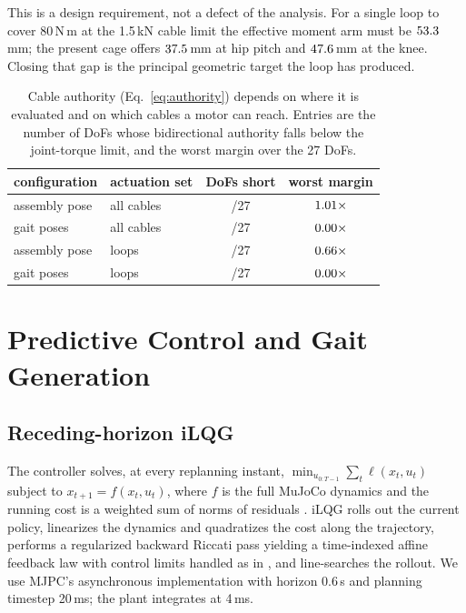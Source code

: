 \documentclass[conference]{IEEEtran}
\begin{document}
This is a design requirement, not a defect of the analysis. For a single loop
to cover 80\,N\,m at the 1.5\,kN cable limit the effective moment arm must be
$53.3$\,mm; the present cage offers $37.5$\,mm at hip pitch and
$47.6$\,mm at the knee. Closing that gap is the principal geometric
target the loop has produced.

\begin{table}[tb]
\centering
\caption{Cable authority (Eq.~\ref{eq:authority}) depends on where it is
evaluated and on which cables a motor can reach. Entries are the number of
DoFs whose bidirectional authority falls below the joint-torque limit, and the
worst margin over the 27 DoFs.}
\label{tab:authority}
\begin{tabular}{llcc}
\toprule
configuration & actuation set & DoFs short & worst margin\\
\midrule
assembly pose & all cables & \authShortHomeAll{}/27 & $1.01\times$\\
gait poses    & all cables & \authShortGaitAll{}/27 & $0.00\times$\\
assembly pose & \numMotors{} loops & \authShortHomeBom{}/27 & $0.66\times$\\
gait poses    & \numMotors{} loops & \authShortGaitBom{}/27 & $0.00\times$\\
\bottomrule
\end{tabular}
\end{table}

\section{Predictive Control and Gait Generation}
\label{sec:mpc}

\subsection{Receding-horizon iLQG}
The controller solves, at every replanning instant,
$\min_{u_{0:T-1}}\sum_t \ell(x_t,u_t)$ subject to $x_{t+1}=f(x_t,u_t)$, where
$f$ is the full MuJoCo dynamics and the running cost is a weighted sum of
norms of residuals \cite{howell2022mjpc}. iLQG
\cite{li2004ilqr,tassa2012synthesis} rolls out the current policy, linearizes
the dynamics and quadratizes the cost along the trajectory, performs a
regularized backward Riccati pass yielding a time-indexed affine feedback law
with control limits handled as in \cite{tassa2014control}, and line-searches
the rollout. We use MJPC's asynchronous implementation with horizon 0.6\,s and
planning timestep 20\,ms; the plant integrates at 4\,ms.
\end{document}
